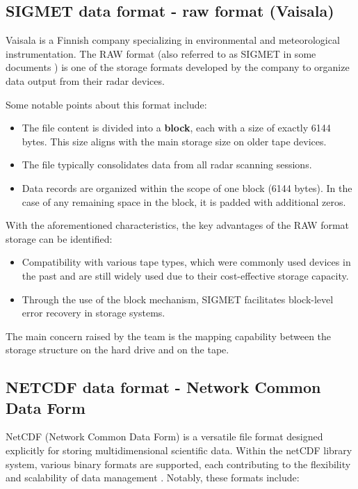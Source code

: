 \subsection{SIGMET data format - raw format (Vaisala)}
\label{sigmet}
Vaisala is a Finnish company specializing in environmental and meteorological instrumentation. The RAW format (also referred to as SIGMET in some documents \cite{lrose_RadxConvert}) is one of the storage formats developed by the company to organize data output from their radar devices.

Some notable points about this format include:

\begin{itemize}
    \item The file content is divided into a \textbf{block}, each with a size of exactly 6144 bytes. This size aligns with the main storage size on older tape devices.
    \item The file typically consolidates data from all radar scanning sessions.
    \item Data records are organized within the scope of one block (6144 bytes). In the case of any remaining space in the block, it is padded with additional zeros.
\end{itemize}

With the aforementioned characteristics, the key advantages of the RAW format storage can be identified: \cite{raw_product_format_vaisala}

\begin{itemize}
    \item Compatibility with various tape types, which were commonly used devices in the past and are still widely used due to their cost-effective storage capacity.
    \item Through the use of the block mechanism, SIGMET facilitates block-level error recovery in storage systems.
\end{itemize}

The main concern raised by the team is the mapping capability between the storage structure on the hard drive and on the tape.

\subsection{NETCDF data format - Network Common Data Form}

NetCDF (Network Common Data Form) is a versatile file format designed explicitly for storing multidimensional scientific data. Within the netCDF library system, various binary formats are supported, each contributing to the flexibility and scalability of data management \cite{netcdf}. Notably, these formats include:


